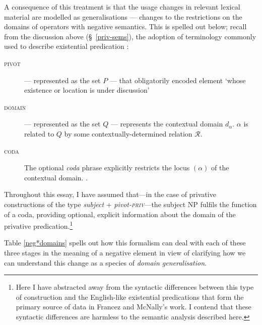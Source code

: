 A consequence of this treatment is that the usage changes in relevant lexical material are modelled as generalisations --- changes to the restrictions on the domains of operators with negative semantics. This is spelled out below; recall from the discussion above (\S~\ref{priv-sems}), the adoption of terminology commonly used to describe existential predication \citep[\textit{e.g.},][]{Francez2007,McNally2016}:
\begin{description}
	\item[\textsc{pivot}] --- represented as the set $ \mathit P $ --- that obligatorily encoded element `whose existence or location is under discussion' \citep[212]{McNally2016}
	\item[\textsc{domain}] --- represented as the set $ \mathit Q $  --- represents the contextual domain $ d_\alpha $.  $ \alpha $ is related to $ Q $ by some contextually-determined relation $ \mathcal R $.
	\item[\textsc{coda}] The optional \textit{coda} phrase explicitly restricts the locus $ (\alpha) $ of the contextual domain. \citep[see][]{Francez2007,Francez2009}.
	
\end{description}

Throughout this essay, I have assumed that---in the case of privative constructions of the type \textit{subject} + \textit{pivot-\textsc{priv}}---the subject NP fulfils the function of a coda, providing optional, explicit information about the domain of the privative predication.\footnote{Here I have abstracted away from the syntactic differences between this type of construction and the English-like existential predications that form the primary source of data in Francez and McNally's work. I contend that these syntactic differences are harmless to the semantic analysis described here.}

Table \ref{neg*domains} spells out how this formalism can deal with each of these three stages in the meaning of a negative element in view of clarifying how we can understand this change as a species of \textit{domain generalisation}.



